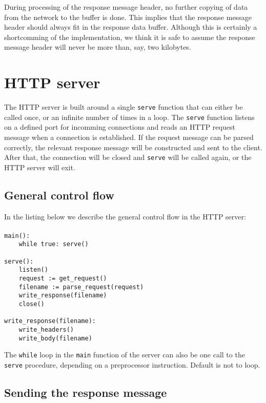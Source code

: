 \documentclass[11pt]{article}
\begin{document}
During processing of the response message header, no further copying of data
from the network to the buffer is done. This implies that the response message
header should always fit in the response data buffer. Although this is
certainly a shortcomming of the implementation, we think it is safe to assume
the response message header will never be more than, say, two kilobytes.


\section{HTTP server}

The HTTP server is built around a single \lstinline|serve| function that can either
be called once, or an infinite number of times in a loop. The \lstinline|serve|
function listens on a defined port for incomming connections and reads an HTTP
request message when a connection is established. If the request message can
be parsed correctly, the relevant response message will be constructed and
sent to the client. After that, the connection will be closed and \lstinline|serve|
will be called again, or the HTTP server will exit.


\subsection{General control flow}

In the listing below we describe the general control flow in the HTTP server:

\paragraph{}

\begin{lstlisting}[title=HTTP client control flow]
main():
    while true: serve()

serve():
    listen()
    request := get_request()
    filename := parse_request(request)
    write_response(filename)
    close()

write_response(filename):
    write_headers()
    write_body(filename)
\end{lstlisting}

The \lstinline|while| loop in the \lstinline|main| function of the server can
also be one call to the \lstinline|serve| procedure, depending on a preprocessor
instruction. Default is not to loop.


\subsection{Sending the response message}
\end{document}
